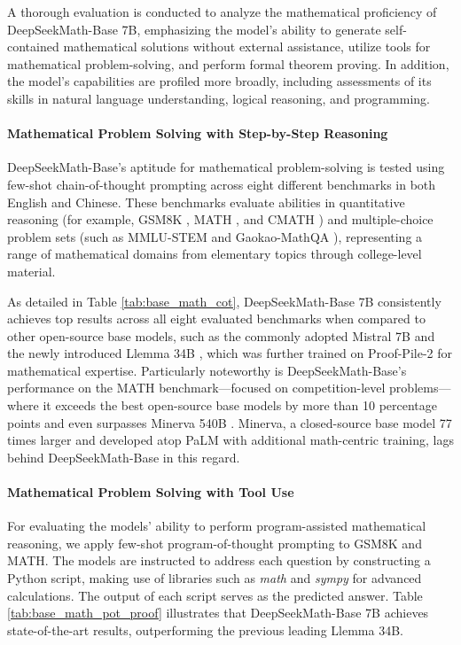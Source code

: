 A thorough evaluation is conducted to analyze the mathematical proficiency of DeepSeekMath-Base 7B, emphasizing the model’s ability to generate self-contained mathematical solutions without external assistance, utilize tools for mathematical problem-solving, and perform formal theorem proving. In addition, the model’s capabilities are profiled more broadly, including assessments of its skills in natural language understanding, logical reasoning, and programming.

\paragraph{Mathematical Problem Solving with Step-by-Step Reasoning}

DeepSeekMath-Base's aptitude for mathematical problem-solving is tested using few-shot chain-of-thought prompting \citep{cot} across eight different benchmarks in both English and Chinese. These benchmarks evaluate abilities in quantitative reasoning (for example, GSM8K \citep{gsm8k}, MATH \citep{MATH}, and CMATH \citep{wei2023cmath}) and multiple-choice problem sets (such as MMLU-STEM \citep{mmlu} and Gaokao-MathQA \citep{agieval}), representing a range of mathematical domains from elementary topics through college-level material.

As detailed in Table \ref{tab:base_math_cot}, DeepSeekMath-Base 7B consistently achieves top results across all eight evaluated benchmarks when compared to other open-source base models, such as the commonly adopted Mistral 7B \citep{mistral} and the newly introduced Llemma 34B \citep{llemma}, which was further trained on Proof-Pile-2 \citep{llemma} for mathematical expertise. Particularly noteworthy is DeepSeekMath-Base’s performance on the MATH benchmark—focused on competition-level problems—where it exceeds the best open-source base models by more than 10 percentage points and even surpasses Minerva 540B \citep{minerva}. Minerva, a closed-source base model 77 times larger and developed atop PaLM \citep{palm} with additional math-centric training, lags behind DeepSeekMath-Base in this regard.

\paragraph{Mathematical Problem Solving with Tool Use} 
For evaluating the models’ ability to perform program-assisted mathematical reasoning, we apply few-shot program-of-thought prompting \citep{pot,pal} to GSM8K and MATH. The models are instructed to address each question by constructing a Python script, making use of libraries such as \textit{math} and \textit{sympy} for advanced calculations. The output of each script serves as the predicted answer. Table \ref{tab:base_math_pot_proof} illustrates that DeepSeekMath-Base 7B achieves state-of-the-art results, outperforming the previous leading Llemma 34B.

